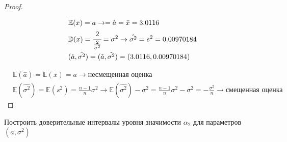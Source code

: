 \begin{proof}
\begin{itemize}
		\begin{align}
			& \mathbb{E}(x)=a\rightarrow=\hat{a}=\bar{x}=3.0116 \\
			& \mathbb{D}(x)=\cfrac{2}{\frac{2}{\sigma^2}}=\sigma^2\rightarrow\hat{\sigma^2}=s^2=0.00970184 \\
			& (\hat{a}, \hat{\sigma^2})=(\tilde{a}, \tilde{\sigma^2})=(3.0116, 0.00970184)
		\end{align}
	\end{itemize}
	\begin{align}
		& \mathbb{E}(\hat{a})=\mathbb{E}(\bar{x})=a\rightarrow\text{несмещенная оценка} \\
		& \mathbb{E}(\hat{\sigma^2})=\mathbb{E}(s^2)=\frac{n-1}{n}\sigma^2\rightarrow\mathbb{E}(\hat{\sigma^2})-\sigma^2=\frac{n-1}{n}\sigma^2-\sigma^2=-\frac{\sigma^2}{n}\rightarrow\text{смещенная оценка}
	\end{align}
\end{proof}


\begin{problem}
	Построить доверительные интервалы уровня значимости $\alpha_2$ для параметров $(a, \sigma^2)$ 	
\end{problem}

